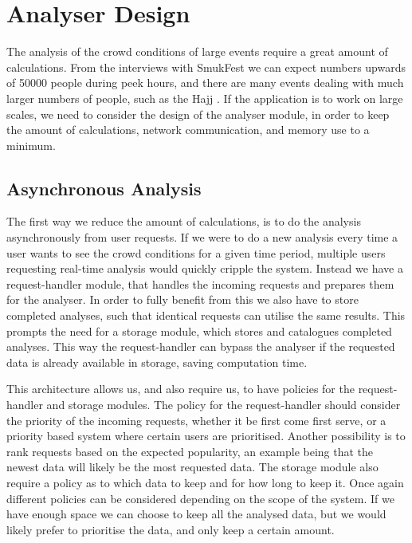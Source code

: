 \section{Analyser Design}\label{s3:analyser_design}

The analysis of the crowd conditions of large events require a great amount of calculations. From the interviews with SmukFest we can expect numbers upwards of 50000 people during peek hours, and there are many events dealing with much larger numbers of people, such as the Hajj \cite{website:Wikipedia-Hajj2}. If the application is to work on large scales, we need to consider the design of the analyser module, in order to keep the amount of calculations, network communication, and memory use to a minimum.

\subsection{Asynchronous Analysis}

The first way we reduce the amount of calculations, is to do the analysis asynchronously from user requests. If we were to do a new analysis every time a user wants to see the crowd conditions for a given time period, multiple users requesting real-time analysis would quickly cripple the system. Instead we have a request-handler module, that handles the incoming requests and prepares them for the analyser. In order to fully benefit from this we also have to store completed analyses, such that identical requests can utilise the same results. This prompts the need for a storage module, which stores and catalogues completed analyses. This way the request-handler can bypass the analyser if the requested data is already available in storage, saving computation time.

This architecture allows us, and also require us, to have policies for the request-handler and storage modules. The policy for the request-handler should consider the priority of the incoming requests, whether it be first come first serve, or a priority based system where certain users are prioritised. Another possibility is to rank requests based on the expected popularity, an example being that the newest data will likely be the most requested data. The storage module also require a policy as to which data to keep and for how long to keep it. Once again different policies can be considered depending on the scope of the system. If we have enough space we can choose to keep all the analysed data, but we would likely prefer to prioritise the data, and only keep a certain amount.

